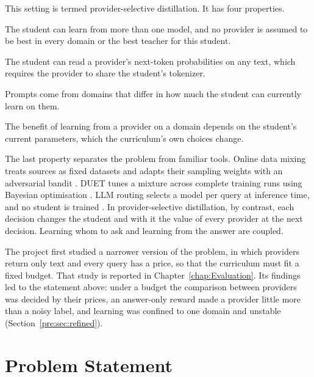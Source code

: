 This setting is termed provider-selective distillation. It has four properties.

\begin{description}[itemsep=2pt,topsep=4pt]
  \item[Several providers.] The student can learn from more than one model, and no
    provider is assumed to be best in every domain or the best teacher for this
    student.
  \item[White-box access.] The student can read a provider's next-token probabilities
    on any text, which requires the provider to share the student's tokenizer.
  \item[Several domains.] Prompts come from domains that differ in how much the
    student can currently learn on them.
  \item[State-dependent value.] The benefit of learning from a provider on a domain
    depends on the student's current parameters, which the curriculum's own choices
    change.
\end{description}

The last property separates the problem from familiar tools. Online data mixing treats
sources as fixed datasets and adapts their sampling weights with an adversarial bandit
\autocite{albalak_odm_2023,auer_exp3_2002}. DUET tunes a mixture across complete
training runs using Bayesian optimisation \autocite{chen_duet_2026}. LLM routing
selects a model per query at inference time, and no student is trained
\autocite{ong_routellm_2025}. In provider-selective distillation, by contrast, each
decision changes the student and with it the value of every provider at the next
decision. Learning whom to ask and learning from the answer are coupled.

The project first studied a narrower version of the problem, in which providers
return only text and every query has a price, so that the curriculum must fit a fixed
budget. That study is reported in Chapter~\ref{chap:Evaluation}. Its findings led to
the statement above: under a budget the comparison between providers was decided by
their prices, an answer-only reward made a provider little more than a noisy label,
and learning was confined to one domain and unstable
(Section~\ref{pre:sec:refined}).

\section{Problem Statement}
\label{sec:Problem Statement}

